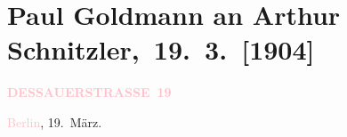 

\renewcommand{\erwaehntePersonen}{Personen: Fritz Freund, Wolfgang Heine}
\renewcommand{\erwaehnteInstitutionen}{Institutionen: Ernst Rowohlt Verlag, Staatsanwaltschaft Berlin, Wiener Verlag}
\renewcommand{\erwaehnteOrte}{Orte: Berlin, Dessauer Straße, Deutschland, Polen, Wien}
\renewcommand{\erwaehnteWerke}{Werke: Der Kampf um den Reigen. Vollständiger Bericht über die sechstägige Verhandlung gegen Direktion und Darsteller des Kleinen Schauspielhauses Berlin, Neue Freie Presse, Reigen. Zehn Dialoge}
\section[ Paul Goldmann an Arthur Schnitzler, 19. 3. {[}1904{]}]{Paul Goldmann an Arthur Schnitzler, 19. 3. {[}1904{]}}
\nopagebreak{}
\rehead{ }\normalsize\beginnumbering{}
\toendnotes[C]{\smallbreak\pagebreak[2]}
\toendnotes[C]{\smallbreak}
\pstart
           \noindent{}\raggedleft{}{\pb}\textcolor{gray}{\textbf{\textcolor{pink}{DESSAUERSTRASSE 19}{}\ledrightnote{\textcolor{pink}{Dessauer Straße}}}}\pend
           
\pstart
           \textcolor{pink}{Berlin}{}\ledrightnote{\textcolor{pink}{Berlin}}, 19. März.\pend
           
